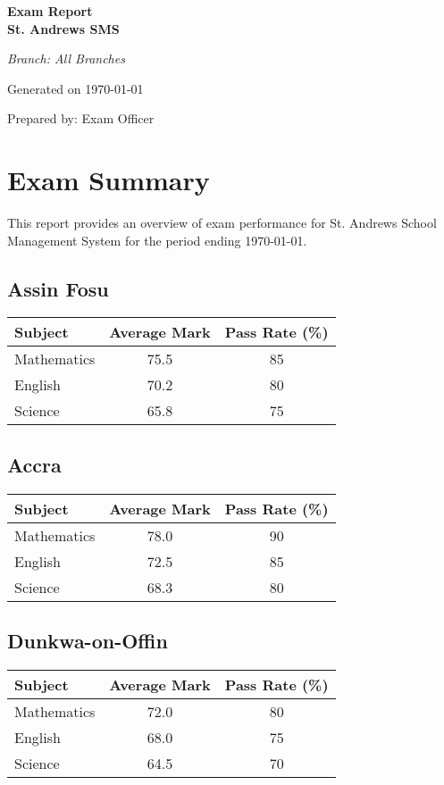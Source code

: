 \documentclass[a4paper,12pt]{article}
\begin{document}
\begin{titlepage}
    \centering
    \vspace*{2cm}
    {\color{twilight}\huge\bfseries Exam Report \\ St. Andrews SMS \par}
    \vspace{1cm}
    {\Large\itshape Branch: All Branches \par}
    \vspace{0.5cm}
    {\large Generated on \today \par}
    \vspace{2cm}
    {\large Prepared by: Exam Officer \par}
\end{titlepage}

\section*{Exam Summary}
This report provides an overview of exam performance for St. Andrews School Management System for the period ending \today.

\subsection*{Assin Fosu}
\begin{tabular}{l S[table-format=2.1] c}
    \toprule
    \textbf{Subject} & \textbf{Average Mark} & \textbf{Pass Rate (\%)} \\
    \midrule
    Mathematics & 75.5 & 85 \\
    English & 70.2 & 80 \\
    Science & 65.8 & 75 \\
    \bottomrule
\end{tabular}

\subsection*{Accra}
\begin{tabular}{l S[table-format=2.1] c}
    \toprule
    \textbf{Subject} & \textbf{Average Mark} & \textbf{Pass Rate (\%)} \\
    \midrule
    Mathematics & 78.0 & 90 \\
    English & 72.5 & 85 \\
    Science & 68.3 & 80 \\
    \bottomrule
\end{tabular}

\subsection*{Dunkwa-on-Offin}
\begin{tabular}{l S[table-format=2.1] c}
    \toprule
    \textbf{Subject} & \textbf{Average Mark} & \textbf{Pass Rate (\%)} \\
    \midrule
    Mathematics & 72.0 & 80 \\
    English & 68.0 & 75 \\
    Science & 64.5 & 70 \\
    \bottomrule
\end{tabular}
\end{document}
